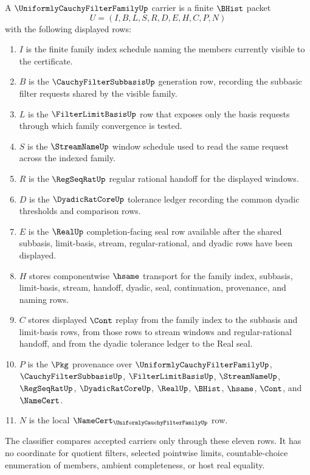 \begin{definition}
\label{def:uniformly-cauchy-filter-family-carrier}
A $\UniformlyCauchyFilterFamilyUp$ carrier is a finite $\BHist$ packet
$$
U=(I,B,L,S,R,D,E,H,C,P,N)
$$
with the following displayed rows:
\begin{enumerate}
\item $I$ is the finite family index schedule naming the members currently visible to the certificate.
\item $B$ is the $\CauchyFilterSubbasisUp$ generation row, recording the subbasic filter requests shared by the visible family.
\item $L$ is the $\FilterLimitBasisUp$ row that exposes only the basis requests through which family convergence is tested.
\item $S$ is the $\StreamNameUp$ window schedule used to read the same request across the indexed family.
\item $R$ is the $\RegSeqRatUp$ regular rational handoff for the displayed windows.
\item $D$ is the $\DyadicRatCoreUp$ tolerance ledger recording the common dyadic thresholds and comparison rows.
\item $E$ is the $\RealUp$ completion-facing seal row available after the shared subbasis, limit-basis, stream, regular-rational, and dyadic rows have been displayed.
\item $H$ stores componentwise $\hsame$ transport for the family index, subbasis, limit-basis, stream, handoff, dyadic, seal, continuation, provenance, and naming rows.
\item $C$ stores displayed $\Cont$ replay from the family index to the subbasis and limit-basis rows, from those rows to stream windows and regular-rational handoff, and from the dyadic tolerance ledger to the Real seal.
\item $P$ is the $\Pkg$ provenance over $\UniformlyCauchyFilterFamilyUp$, $\CauchyFilterSubbasisUp$, $\FilterLimitBasisUp$, $\StreamNameUp$, $\RegSeqRatUp$, $\DyadicRatCoreUp$, $\RealUp$, $\BHist$, $\hsame$, $\Cont$, and $\NameCert$.
\item $N$ is the local $\NameCert_{\UniformlyCauchyFilterFamilyUp}$ row.
\end{enumerate}
The classifier compares accepted carriers only through these eleven rows. It has no coordinate for quotient filters, selected pointwise limits, countable-choice enumeration of members, ambient completeness, or host real equality.
\end{definition}

